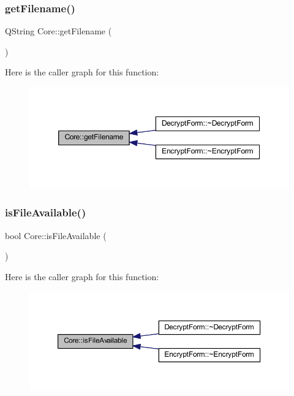 \subsubsection{\texorpdfstring{get\+Filename()}{getFilename()}}
{\footnotesize\ttfamily Q\+String Core\+::get\+Filename (\begin{DoxyParamCaption}{ }\end{DoxyParamCaption})}

Here is the caller graph for this function\+:
\nopagebreak
\begin{figure}[H]
\begin{center}
\leavevmode
\includegraphics[width=350pt]{class_core_aa75cf5dbf2f48a261a8596c42cf99946_icgraph}
\end{center}
\end{figure}
\hypertarget{class_core_a97c1ce83217497c5000ab5454628b7b2}{}\label{class_core_a97c1ce83217497c5000ab5454628b7b2} 
\subsubsection{\texorpdfstring{is\+File\+Available()}{isFileAvailable()}\hspace{0.1cm}{\footnotesize\ttfamily [1/2]}}
{\footnotesize\ttfamily bool Core\+::is\+File\+Available (\begin{DoxyParamCaption}{ }\end{DoxyParamCaption})}

Here is the caller graph for this function\+:
\nopagebreak
\begin{figure}[H]
\begin{center}
\leavevmode
\includegraphics[width=350pt]{class_core_a97c1ce83217497c5000ab5454628b7b2_icgraph}
\end{center}
\end{figure}
\hypertarget{class_core_a87e3e55dfb83db550283f160a5f9fd76}{}\label{class_core_a87e3e55dfb83db550283f160a5f9fd76} 

